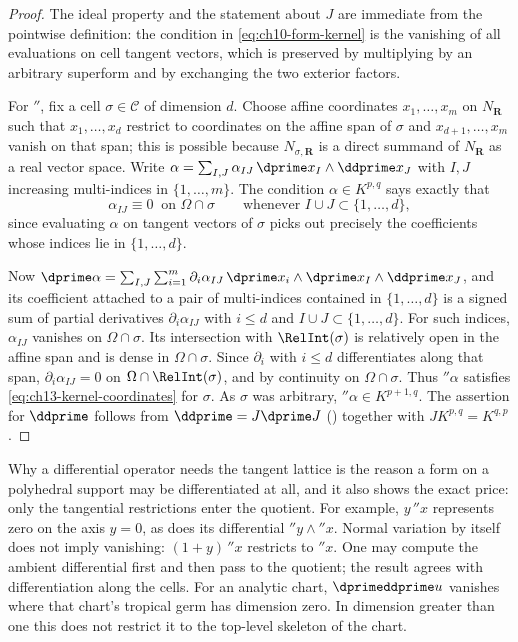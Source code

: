 \begin{proof}
The ideal property and the statement about $J$ are immediate from the
pointwise definition: the condition in \eqref{eq:ch10-form-kernel} is the
vanishing of all evaluations on cell tangent vectors, which is preserved by
multiplying by an arbitrary superform and by exchanging the two exterior
factors.

For $\dprime$, fix a cell $\sigma\in\mathscr C$ of dimension $d$.
Choose affine coordinates $x_1,\ldots,x_m$ on
$N_{\mathbf R}$ such that $x_1,\ldots,x_d$ restrict to coordinates on the
affine span of $\sigma$ and $x_{d+1},\ldots,x_m$ vanish on that span; this is
possible because $N_{\sigma,\mathbf R}$ is a direct summand of
$N_{\mathbf R}$ as a real vector space.  Write
$\alpha=\sum_{I,J}\alpha_{IJ}\,\dprime x_I\wedge\ddprime x_J$ with $I,J$
increasing multi-indices in $\{1,\ldots,m\}$.  The condition
$\alpha\in K^{p,q}$ says exactly that
\begin{equation}
\label{eq:ch13-kernel-coordinates}
 \alpha_{IJ}\equiv0\ \text{ on }\Omega\cap\sigma
 \qquad\text{whenever }I\cup J\subset\{1,\ldots,d\},
\end{equation}
since evaluating $\alpha$ on tangent vectors of $\sigma$ picks out precisely
the coefficients whose indices lie in $\{1,\ldots,d\}$.

Now
$\dprime\alpha
=\sum_{I,J}\sum_{i=1}^m\partial_i\alpha_{IJ}\,
\dprime x_i\wedge\dprime x_I\wedge\ddprime x_J$, and its coefficient
attached to a pair of multi-indices contained in $\{1,\ldots,d\}$ is a
signed sum of partial derivatives $\partial_i\alpha_{IJ}$ with $i\le d$
and $I\cup J\subset\{1,\ldots,d\}$.  For such indices, $\alpha_{IJ}$
vanishes on $\Omega\cap\sigma$.  Its intersection with $\RelInt(\sigma)$
is relatively open in the affine span and is dense in $\Omega\cap\sigma$.
Since $\partial_i$ with $i\le d$ differentiates along that span,
$\partial_i\alpha_{IJ}=0$ on $\Omega\cap\RelInt(\sigma)$, and by
continuity on $\Omega\cap\sigma$.  Thus $\dprime\alpha$ satisfies
\eqref{eq:ch13-kernel-coordinates} for $\sigma$.  As $\sigma$ was arbitrary,
$\dprime\alpha\in K^{p+1,q}$.  The assertion for $\ddprime$ follows from
$\ddprime=J\dprime J$ () together with
$JK^{p,q}=K^{q,p}$.
\end{proof}

\begin{warning}{Why a differential operator needs the tangent lattice}
 is the reason a form on a polyhedral
support may be differentiated at all, and it also shows the exact price:
only the tangential restrictions enter the quotient.  For example,
$y\,\dprime x$ represents zero on the axis $y=0$, as does its differential
$\dprime y\wedge\dprime x$.  Normal variation by itself does not imply
vanishing: $(1+y)\,\dprime x$ restricts to $\dprime x$.
One may compute the ambient differential first and then pass to the
quotient; the result agrees with differentiation along the cells.
For an analytic chart, $\dprimeddprime u$ vanishes where that chart's
tropical germ has dimension zero.  In dimension greater than one this
does not restrict it to the top-level skeleton of the chart.
\end{warning}

